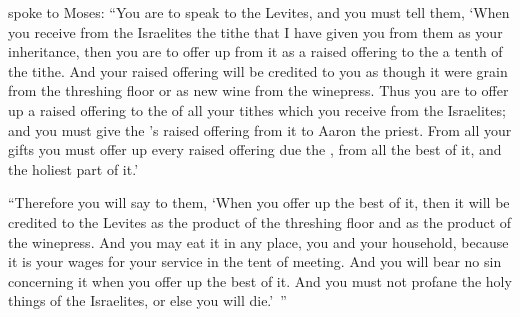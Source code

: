 {{}
spoke
to
Moses:
“You are to speak to
the Levites,
and you must
tell
them,
‘When
you receive
from the
Israelites
the
tithe
that
I have given
you from them as your inheritance,
then you are to offer
up from
it as a raised
offering to the
{}
a tenth
of the tithe.
And your raised
offering will be credited
to you as though it were grain
from
the threshing floor
or as new wine
from the winepress.
Thus
you
are to offer
up a raised
offering to the
{}
of all
your tithes
which
you receive
from the
Israelites;
and you must give
the
{}’s
raised
offering from
it to Aaron
the priest.
From all
your gifts
you must offer
up every
raised
offering due the
{}, from all
the best
of it, and the holiest part of it.’
\par }{\PP {}“Therefore you will say
to them, ‘When you offer
up the
best
of it, then it
will be
credited
to the Levites
as the product
of the threshing floor
and as the product
of the winepress.
And you may eat
it in any
place,
you
and your household,
because
it is your wages
for
your service
in the tent
of meeting.
And you will bear
no
sin
concerning it when you offer
up the
best
of it.
And you must not profane
the
holy
things of the Israelites,
or else you will die.’ ”


}
